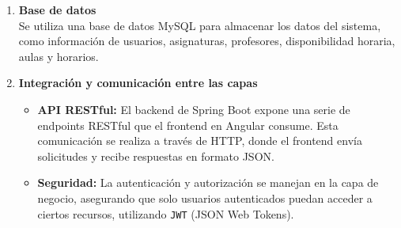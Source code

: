 \documentclass{article} %
\begin{document}
\begin{enumerate}[font=\bfseries]
        \item \textbf{Base de datos} \\
        \noindent Se utiliza una base de datos MySQL para almacenar los datos del sistema, como información de usuarios, asignaturas, profesores, disponibilidad horaria, aulas y horarios.
        
        \item \textbf{Integración y comunicación entre las capas}
        \begin{itemize}
            \item \textbf{API RESTful:} El backend de Spring Boot expone una serie de endpoints RESTful que el frontend en Angular consume. Esta comunicación se realiza a través de HTTP, donde el frontend envía solicitudes y recibe respuestas en formato JSON.
            \item \textbf{Seguridad:} La autenticación y autorización se manejan en la capa de negocio, asegurando que solo usuarios autenticados puedan acceder a ciertos recursos, utilizando \texttt{JWT} (JSON Web Tokens).
        \end{itemize}
    \end{enumerate}
    
\end{document}
